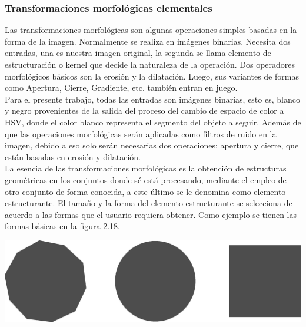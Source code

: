 \subsubsection{Transformaciones morfológicas elementales}
Las transformaciones morfológicas son algunas operaciones simples basadas en la forma de la imagen. Normalmente se realiza en
imágenes binarias. Necesita dos entradas, una es nuestra imagen original, la segunda se llama elemento de estructuración o
kernel que decide la naturaleza de la operación. Dos operadores morfológicos básicos son la erosión y la dilatación. Luego,
sus variantes de formas como Apertura, Cierre, Gradiente, etc. también entran en juego. \cite{WEB:Ieeeucsa2019}\\
Para el presente trabajo, todas las entradas son imágenes binarias, esto es, blanco y negro provenientes de la salida
del proceso del cambio de espacio de color a HSV, donde el color blanco representa el segmento del objeto a seguir. Además de que
las operaciones morfológicas serán aplicadas como filtros de ruido en la imagen, debido a eso solo serán necesarias dos operaciones:
apertura y cierre, que están basadas en erosión y dilatación.\\
La esencia de las transformaciones morfológicas es la obtención de estructuras geométricas en los conjuntos donde sé está procesando,
mediante el empleo de otro conjunto de forma conocida, a este último se le denomina como elemento estructurante.
El tamaño y la forma del elemento estructurante se selecciona de acuerdo a las formas que el usuario requiera obtener.
Como ejemplo se tienen las formas básicas en la figura 2.18.
\begin{center}
	\includegraphics[width=0.5 \textwidth]{Contenido/Cuerpo/Capitulo2/Fig13.eps}
	\label{fig:MarcoTeorico:Fig22}
\end{center}


